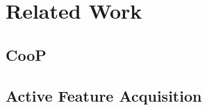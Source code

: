 \documentclass[../main.tex]{subfiles}
\begin{document}
\chapter{Related Work}

\section{CooP}
\section{Active Feature Acquisition}\label{related:afa}
\end{document}
